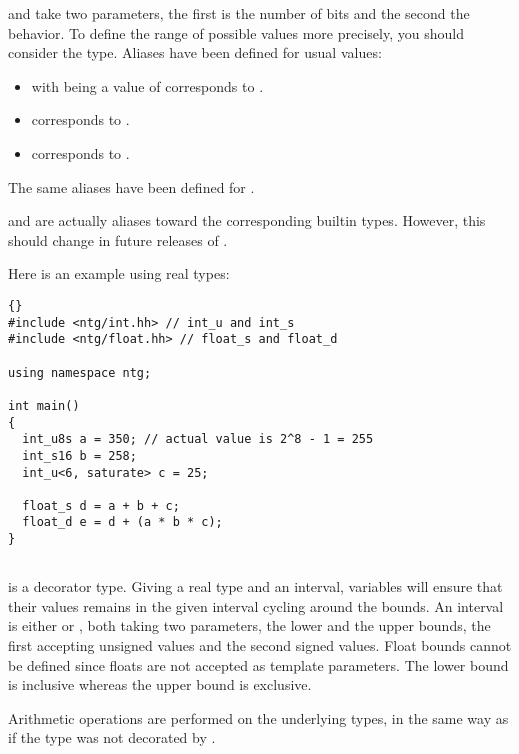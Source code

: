  and  take two parameters, the first is the
number of bits and the second the behavior.  To define the range of
possible values more precisely, you should consider the 
type.  Aliases have been defined for usual values:

\begin{itemize}
\item {} with  being a value of 
  corresponds to .
\item {} corresponds to .
\item {} corresponds to .
\end{itemize}

The same aliases have been defined for .

 and  are actually aliases toward the
corresponding builtin types.  However, this should change in future
releases of \integre.

Here is an example using real types:

\begin{lstlisting}{}
#include <ntg/int.hh> // int_u and int_s
#include <ntg/float.hh> // float_s and float_d

using namespace ntg;

int main()
{
  int_u8s a = 350; // actual value is 2^8 - 1 = 255
  int_s16 b = 258;
  int_u<6, saturate> c = 25;

  float_s d = a + b + c;
  float_d e = d + (a * b * c);
}
\end{lstlisting}

\subsection{}

 is a decorator type.  Giving a real type and an interval,
 variables will ensure that their values remains in the
given interval cycling around the bounds.  An interval is either
 or , both taking two parameters, the
lower and the upper bounds, the first accepting unsigned values and
the second signed values.  Float bounds cannot be defined since floats
are not accepted as template parameters.  The lower bound is inclusive
whereas the upper bound is exclusive.

Arithmetic operations are performed on the underlying types, in the
same way as if the type was not decorated by .

